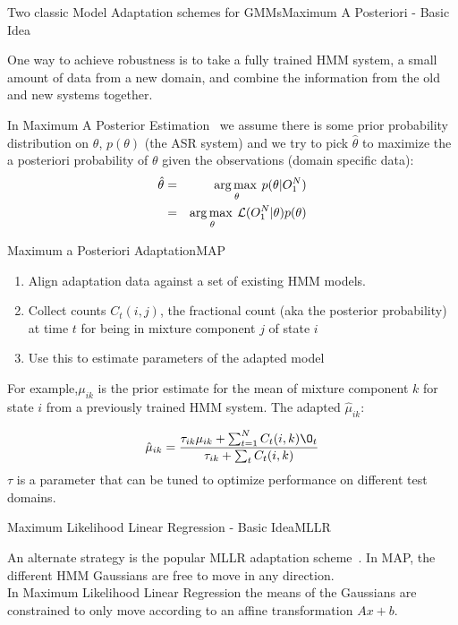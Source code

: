 \begin{frame}{Two classic Model Adaptation schemes for GMMs}{Maximum A Posteriori  - Basic Idea}

One way to achieve robustness is to take a fully trained HMM
system, a small amount of data from a new domain, and combine the
information from the old and new systems together. 

In Maximum A Posterior Estimation~\cite{lee1996bayesian} we assume there is some prior
probability distribution on $\theta$, $p(\theta)$ (the ASR system) and we try to
pick $\hat{\theta}$ to maximize the a posteriori probability of $\theta$ given the
observations (domain specific data):
\begin{eqnarray*}
\hat{\theta} & = & \operatorname*{arg\,max\:}_{\theta} p(\theta|O_{1}^{N} ) \\
& = & \operatorname*{arg\,max\:}_{\theta} \mathcal{L}(O_{1}^{N}|\theta) p(\theta)
\end{eqnarray*}

\end{frame}

\begin{frame}{Maximum a Posteriori Adaptation}{MAP}

\begin{enumerate}
\item Align adaptation data against a set of existing HMM models.
\item Collect counts $C_t(i,j)$, the fractional count (aka the posterior probability)  at time $t$ for being in mixture component $j$ of state $i$
\item Use this to estimate parameters of the adapted model
\end{enumerate}

For example,$\mu_{ik}$ is  the prior estimate for the mean of mixture
component $k$ for state $i$ from a previously trained HMM system. The adapted $\hat{\mu}_{ik}$:

\[ \hat{\mu}_{ik} =
  \frac{\tau_{ik}\mu_{ik}+\sum_{t=1}^{N}C_{t}(i,k)\O_t}{\tau_{ik}+\sum_{t}C_{t}(i,k)}
  \]
$\tau$ is a parameter that can be tuned to optimize performance on different test domains. 
\end{frame}

\begin{frame}{Maximum Likelihood Linear Regression - Basic Idea}{MLLR}

An alternate strategy is the popular MLLR adaptation scheme~\cite{leggetter1995maximum}. In MAP, the different HMM Gaussians are free to move in any direction. \\
In Maximum Likelihood Linear Regression the means of the Gaussians are constrained to only move according to an affine transformation $Ax+b$.

\end{frame}

